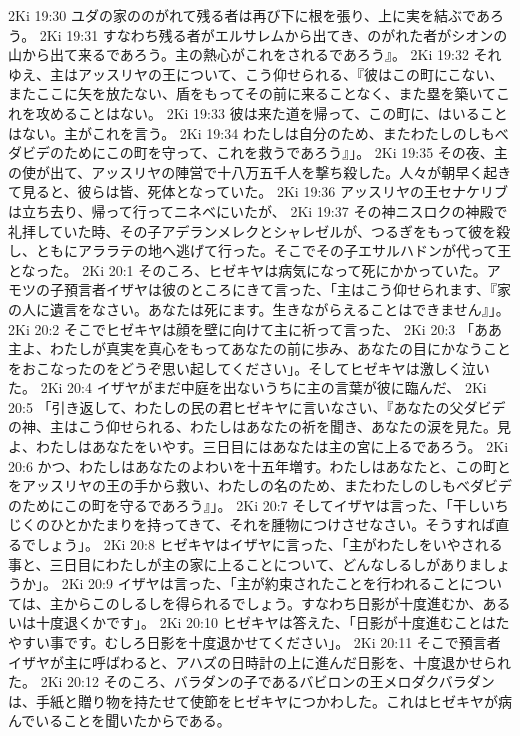 2Ki 19:30  ユダの家ののがれて残る者は再び下に根を張り、上に実を結ぶであろう。
2Ki 19:31  すなわち残る者がエルサレムから出てき、のがれた者がシオンの山から出て来るであろう。主の熱心がこれをされるであろう』。
2Ki 19:32  それゆえ、主はアッスリヤの王について、こう仰せられる、『彼はこの町にこない、またここに矢を放たない、盾をもってその前に来ることなく、また塁を築いてこれを攻めることはない。
2Ki 19:33  彼は来た道を帰って、この町に、はいることはない。主がこれを言う。
2Ki 19:34  わたしは自分のため、またわたしのしもべダビデのためにこの町を守って、これを救うであろう』」。
2Ki 19:35  その夜、主の使が出て、アッスリヤの陣営で十八万五千人を撃ち殺した。人々が朝早く起きて見ると、彼らは皆、死体となっていた。
2Ki 19:36  アッスリヤの王セナケリブは立ち去り、帰って行ってニネベにいたが、
2Ki 19:37  その神ニスロクの神殿で礼拝していた時、その子アデランメレクとシャレゼルが、つるぎをもって彼を殺し、ともにアララテの地へ逃げて行った。そこでその子エサルハドンが代って王となった。
2Ki 20:1  そのころ、ヒゼキヤは病気になって死にかかっていた。アモツの子預言者イザヤは彼のところにきて言った、「主はこう仰せられます、『家の人に遺言をなさい。あなたは死にます。生きながらえることはできません』」。
2Ki 20:2  そこでヒゼキヤは顔を壁に向けて主に祈って言った、
2Ki 20:3  「ああ主よ、わたしが真実を真心をもってあなたの前に歩み、あなたの目にかなうことをおこなったのをどうぞ思い起してください」。そしてヒゼキヤは激しく泣いた。
2Ki 20:4  イザヤがまだ中庭を出ないうちに主の言葉が彼に臨んだ、
2Ki 20:5  「引き返して、わたしの民の君ヒゼキヤに言いなさい、『あなたの父ダビデの神、主はこう仰せられる、わたしはあなたの祈を聞き、あなたの涙を見た。見よ、わたしはあなたをいやす。三日目にはあなたは主の宮に上るであろう。
2Ki 20:6  かつ、わたしはあなたのよわいを十五年増す。わたしはあなたと、この町とをアッスリヤの王の手から救い、わたしの名のため、またわたしのしもべダビデのためにこの町を守るであろう』」。
2Ki 20:7  そしてイザヤは言った、「干しいちじくのひとかたまりを持ってきて、それを腫物につけさせなさい。そうすれば直るでしょう」。
2Ki 20:8  ヒゼキヤはイザヤに言った、「主がわたしをいやされる事と、三日目にわたしが主の家に上ることについて、どんなしるしがありましょうか」。
2Ki 20:9  イザヤは言った、「主が約束されたことを行われることについては、主からこのしるしを得られるでしょう。すなわち日影が十度進むか、あるいは十度退くかです」。
2Ki 20:10  ヒゼキヤは答えた、「日影が十度進むことはたやすい事です。むしろ日影を十度退かせてください」。
2Ki 20:11  そこで預言者イザヤが主に呼ばわると、アハズの日時計の上に進んだ日影を、十度退かせられた。
2Ki 20:12  そのころ、バラダンの子であるバビロンの王メロダクバラダンは、手紙と贈り物を持たせて使節をヒゼキヤにつかわした。これはヒゼキヤが病んでいることを聞いたからである。

